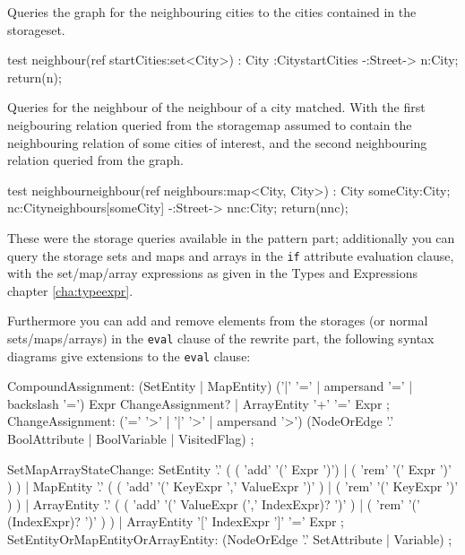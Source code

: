 \begin{example}
Queries the graph for the neighbouring cities to the cities contained in the storageset.
\begin{grgen}
test neighbour(ref startCities:set<City>) : City
{
    :City{startCities} -:Street-> n:City;
    return(n);
}
\end{grgen}
\end{example}

\begin{example}
Queries for the neighbour of the neighbour of a city matched.
With the first neigbouring relation queried from the storagemap assumed to contain the neighbouring relation of some cities of interest, and the second neighbouring relation queried from the graph.
\begin{grgen}
test neighbourneighbour(ref neighbours:map<City, City>) : City
{
    someCity:City;
    nc:City{neighbours[someCity]} -:Street-> nnc:City;
    return(nnc);
}
\end{grgen}
\end{example}

These were the storage queries available in the pattern part;
additionally you can query the storage sets and maps and arrays in the \texttt{if} attribute evaluation clause,
with the set/map/array expressions as given in the Types and Expressions chapter \ref{cha:typeexpr}.

Furthermore you can add and remove elements from the storages (or normal sets/maps/arrays) in the \texttt{eval} clause of the rewrite part, the following syntax diagrams give extensions to the \texttt{eval} clause:

\begin{rail}
  CompoundAssignment:
    (SetEntity | MapEntity) ('|' '=' | ampersand '=' | backslash '=') Expr ChangeAssignment? |
    ArrayEntity '+' '=' Expr
  ;
  ChangeAssignment:
    ('=' '>' | '|' '>' | ampersand '>') (NodeOrEdge '.' BoolAttribute | BoolVariable | VisitedFlag)
  ;
\end{rail}

\begin{rail}
  SetMapArrayStateChange:
   	SetEntity '.' ( ( 'add' '(' Expr ')') | ( 'rem' '(' Expr ')' ) ) |
	  MapEntity '.' ( ( 'add' '(' KeyExpr ',' ValueExpr ')' ) | ( 'rem' '(' KeyExpr ')' ) ) |
	  ArrayEntity '.' ( ( 'add' '(' ValueExpr (','  IndexExpr)? ')' ) | ( 'rem' '(' (IndexExpr)? ')' ) ) |
	  ArrayEntity '[' IndexExpr ']' '=' Expr
	;
	SetEntityOrMapEntityOrArrayEntity:
	  (NodeOrEdge '.' SetAttribute | Variable)
	;
\end{rail}

